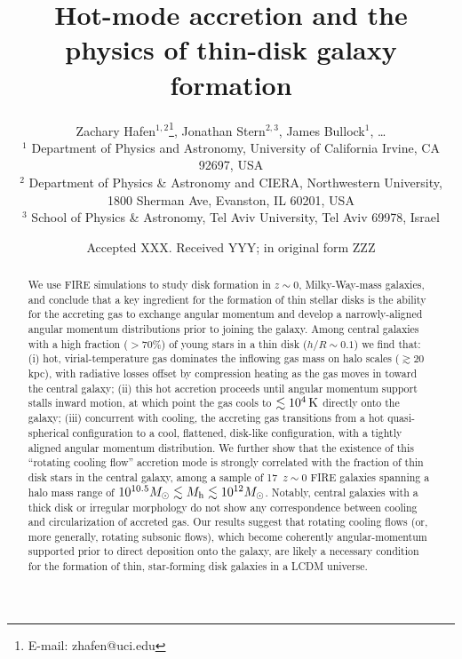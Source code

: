 \documentclass[fleqn,usenatbib]{mnras}
\title[Rotating cooling flows and thin galactic disks]{Hot-mode accretion and the physics of thin-disk galaxy formation}
\author[Hafen, Stern, Bullock et al.]{
Zachary Hafen$^{1,2}$\thanks{E-mail: zhafen@uci.edu},
Jonathan Stern$^{2,3}$,
James Bullock$^{1}$,
\ldots
\\
$^1$ Department of Physics and Astronomy, University of California Irvine, CA 92697, USA
\\
$^2$ Department of Physics \& Astronomy and CIERA, Northwestern University, 1800 Sherman Ave, Evanston, IL 60201, USA \\
$^3$ School of Physics \& Astronomy, Tel Aviv University, Tel Aviv 69978, Israel
}
\date{Accepted XXX. Received YYY; in original form ZZZ}
\newcommand{\Nsample}{17}
\begin{document}
\label{firstpage}
\pagerange{\pageref{firstpage}--\pageref{lastpage}}
\maketitle

\begin{abstract}
We use FIRE simulations to study disk formation in $z\sim 0$, Milky-Way-mass galaxies, and conclude that a key ingredient for the formation of thin stellar disks is the ability for the accreting gas to exchange angular momentum and develop a narrowly-aligned angular momentum distributions prior to joining the galaxy.
Among central galaxies with a high fraction ($>70\%$) of young stars in a thin disk ($h/R \sim 0.1$) we find that:
(i) hot, virial-temperature gas dominates the inflowing gas mass on halo scales ($\gtrsim 20$ kpc), with radiative losses offset by compression heating as the gas moves in toward the central galaxy;
(ii) this hot accretion proceeds until angular momentum support stalls inward motion, at which point the gas cools to $\lesssim10^4\,{\rm K}$ directly onto the galaxy; 
(iii) concurrent with cooling, the accreting gas transitions from a hot quasi-spherical configuration to a cool, flattened, disk-like configuration, with a tightly aligned angular momentum distribution.
We further show that the existence of this ``rotating cooling flow'' accretion mode is strongly correlated with the fraction of thin disk stars in the central galaxy, among a sample of \Nsample\ $z\sim0$ FIRE galaxies spanning a halo mass range of $10^{10.5} M_\odot \lesssim M_{\rm h} \lesssim 10^{12} M_\odot$.
Notably, central galaxies with a thick disk or irregular morphology do not show any correspondence between cooling and circularization of accreted gas.
Our results suggest that rotating cooling flows (or, more generally, rotating subsonic flows), which become coherently angular-momentum supported prior to direct deposition onto the galaxy, are likely a necessary condition for the formation of thin, star-forming disk galaxies in a LCDM universe.

\end{abstract}
\end{document}
